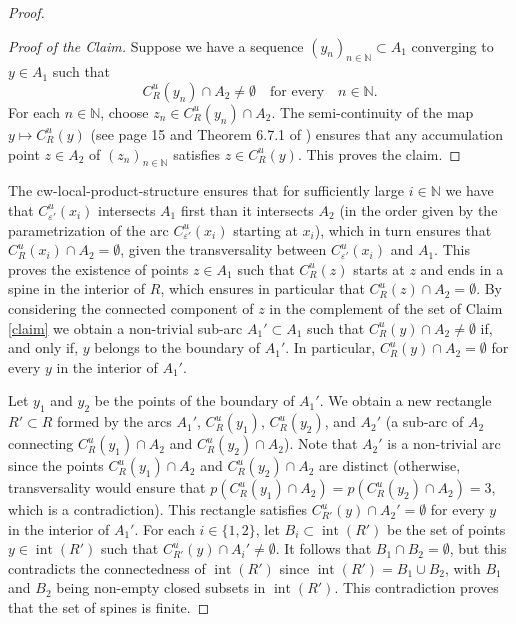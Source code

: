 \documentclass{amsart}
\theoremstyle{plain}
\theoremstyle{definition}
\newcommand{\N}{\mathbb{N}}
\newcommand{\eps}{\varepsilon}
\newcommand{\interior}{\operatorname{int}}
\begin{document}
\begin{proof}
\begin{proof}[Proof of the Claim]
Suppose we have a sequence $(y_n)_{n\in\N}\subset A_1$ converging to $y\in A_1$ such that 
$$C^u_R(y_n)\cap A_2\neq \emptyset \,\,\,\,\,\, \text{for every} \,\,\,\,\,\, n\in\N.$$
For each $n\in\N$, choose $z_n\in C^u_R(y_n)\cap A_2$.
The semi-continuity of the map $y\mapsto C^u_{R}(y)$ (see page 15 and Theorem 6.7.1 of \cite{ArD}) ensures that any accumulation point $z\in A_2$ of $(z_n)_{n\in\N}$ satisfies $z\in C^u_R(y)$. This proves the claim.
\end{proof}

The cw-local-product-structure ensures that for sufficiently large $i\in\N$ we have that $C^u_{\eps'}(x_i)$ intersects $A_1$ first than it intersects $A_2$ (in the order given by the parametrization of the arc $C^u_{\eps'}(x_i)$ starting at $x_i$), which in turn ensures that $C^u_{R}(x_i)\cap A_2=\emptyset$, given the transversality between $C^u_{\eps'}(x_i)$ and $A_1$. This proves the existence of points $z\in A_1$ such that $C^u_{R}(z)$ starts at $z$ and ends in a spine in the interior of $R$, which ensures in particular that $C^u_{R}(z)\cap A_2=\emptyset$. By considering the connected component of $z$ in the complement of the set of Claim \ref{claim} we obtain a non-trivial sub-arc $A_1'\subset A_1$ such that $C^u_R(y)\cap A_2\neq\emptyset$ if, and only if, $y$ belongs to the boundary of $A_1'$. In particular, $C^u_R(y)\cap A_2=\emptyset$ for every $y$ in the interior of $A_1'$. 

Let $y_1$ and $y_2$ be the points of the boundary of $A_1'$.
We obtain a new rectangle $R'\subset R$ formed by the arcs $A_1'$, $C^u_{R}(y_1)$, $C^u_{R}(y_2)$, and $A_2'$ (a sub-arc of $A_2$ connecting $C^u_{R}(y_1)\cap A_2$ and $C^u_{R}(y_2)\cap A_2$). Note that $A_2'$ is a non-trivial arc since the points $C^u_{R}(y_1)\cap A_2$ and $C^u_{R}(y_2)\cap A_2$ are distinct (otherwise, transversality would ensure that $p(C^u_{R}(y_1)\cap A_2)=p(C^u_{R}(%
y_2)\cap A_2)=3$, which is a contradiction).
This rectangle satisfies $C^u_{R'}(y)\cap A_2'=\emptyset$ for every $y$ in the interior of $A_1'$.
For each $i\in\{1,2\}$, let $B_i\subset\interior(R')$ be the set of points $y\in\interior(R')$ such that $C^u_{R'}(y)\cap A_i'\neq\emptyset$. It follows that $B_1\cap B_2=\emptyset$, but this contradicts the connectedness of $\interior(R')$ since $\interior(R')=B_1\cup B_2$, with $B_1$ and $B_2$ being non-empty closed subsets in $\interior(R')$. This contradiction proves that the set of spines is finite. 
\end{proof}
\end{document}
